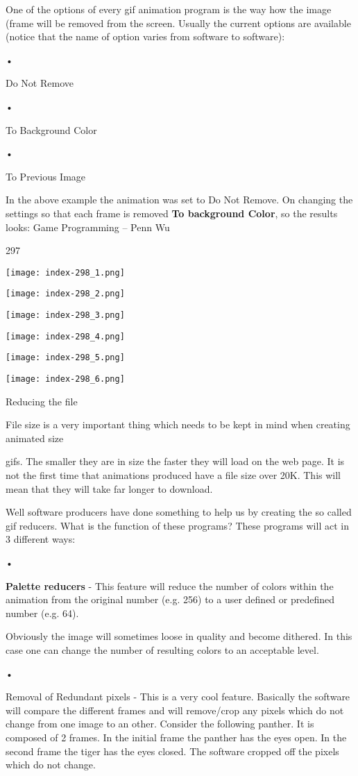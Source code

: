 \documentclass[
]{article}
\begin{document}
One of the options of every gif animation program is the way how the
image (frame will be removed from the screen. Usually the current
options are available (notice that the name of option varies from
software to software):

•

Do Not Remove

•

To Background Color

•

To Previous Image

In the above example the animation was set to Do Not Remove. On changing
the settings so that each frame is removed \textbf{To background Color},
so the results looks: Game Programming -- Penn Wu

297

\protect\hypertarget{index_split_015.htmlux5cux23p298}{}{}\texttt{[image: index-298\_1.png]}

\texttt{[image: index-298\_2.png]}

\texttt{[image: index-298\_3.png]}

\texttt{[image: index-298\_4.png]}

\texttt{[image: index-298\_5.png]}

\texttt{[image: index-298\_6.png]}

Reducing the file

File size is a very important thing which needs to be kept in mind when
creating animated size

gifs. The smaller they are in size the faster they will load on the web
page. It is not the first time that animations produced have a file size
over 20K. This will mean that they will take far longer to download.

Well software producers have done something to help us by creating the
so called gif reducers. What is the function of these programs? These
programs will act in 3 different ways:

•

\textbf{Palette reducers} - This feature will reduce the number of
colors within the animation from the original number (e.g. 256) to a
user defined or predefined number (e.g. 64).

Obviously the image will sometimes loose in quality and become dithered.
In this case one can change the number of resulting colors to an
acceptable level.

•

Removal of Redundant pixels - This is a very cool feature. Basically the
software will compare the different frames and will remove/crop any
pixels which do not change from one image to an other. Consider the
following panther. It is composed of 2 frames. In the initial frame the
panther has the eyes open. In the second frame the tiger has the eyes
closed. The software cropped off the pixels which do not change.
\end{document}
